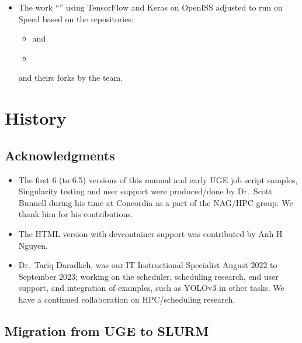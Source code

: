 \documentclass{easychair}
\begin{document}
\begin{itemize}
\item
The work ``'' using TensorFlow and Keras on OpenISS
adjusted to run on Speed based on the repositories:
\begin{itemize}
	\item 
{} and
	\item
{}
\end{itemize}
and theirs forks by the team.

\end{itemize}

\appendix

\section{History}

\subsection{Acknowledgments}
\label{sect:acks}

\begin{itemize}
	\item 
The first 6 (to 6.5) versions of this manual and early UGE job script samples,
Singularity testing and user support were produced/done by Dr.~Scott Bunnell
during his time at Concordia as a part of the NAG/HPC group. We thank
him for his contributions.
	\item 
The HTML version with devcontainer support was contributed by Anh H Nguyen.
	\item 
Dr.~Tariq Daradkeh, was our IT Instructional Specialist August 2022 to September 2023;
working on the scheduler, scheduling research, end user support, and integration of
examples, such as YOLOv3 in  other tasks. We have a continued
collaboration on HPC/scheduling research.
\end{itemize}

\subsection{Migration from UGE to SLURM}
\label{appdx:uge-to-slurm}
\end{document}
